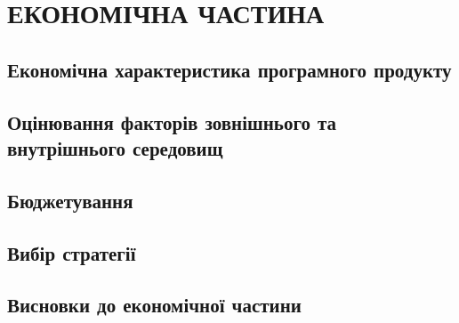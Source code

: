 \chapter{ЕКОНОМІЧНА ЧАСТИНА}

\section{Економічна характеристика програмного продукту}
\section{Оцінювання факторів зовнішнього та внутрішнього середовищ}
\section{Бюджетування}
\section{Вибір стратегії}
\section{Висновки до економічної частини}
